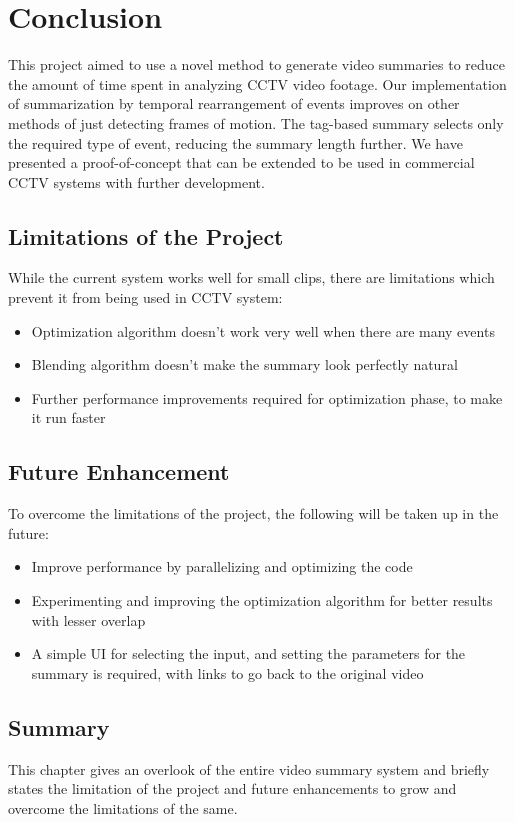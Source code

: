 \chapter{Conclusion}

This project aimed to use a novel method to generate video summaries to reduce the amount of time spent in analyzing CCTV video footage. Our implementation of summarization by temporal rearrangement of events improves on other methods of just detecting frames of motion. The tag-based summary selects only the required type of event, reducing the summary length further.
We have presented a proof-of-concept that can be extended to be used in commercial CCTV systems with further development.

\section{Limitations of the Project}

While the current system works well for small clips, there are limitations which prevent it from being used in CCTV system:
    \begin{itemize}
        \item Optimization algorithm doesn’t work very well when there are many events
        \item Blending algorithm doesn’t make the summary look perfectly natural
        \item Further performance improvements required for optimization phase, to make it run faster
    \end{itemize}

\section{Future Enhancement}

To overcome the limitations of the project, the following will be taken up in the future:
    \begin{itemize}
        \item Improve performance by parallelizing and optimizing the code
        \item Experimenting and improving the optimization algorithm for better results with lesser overlap
        \item A simple UI for selecting the input, and setting the parameters for the summary is required, with links to go back to the original video
    \end{itemize}

\section{Summary}
This chapter gives an overlook of the entire video summary system and briefly states the limitation of the project and future enhancements to grow and overcome the limitations of the same.
